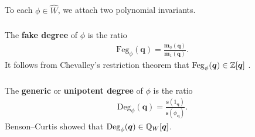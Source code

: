 \documentclass[a4paper,10pt,leqno]{amsart}
\theoremstyle{plain}
\theoremstyle{plain}
\theoremstyle{plain}
\theoremstyle{definition}
\newtheorem{lempost}[thm]{Lemma-Postulate}
\theoremstyle{remark}
\newcommand{\dfemph}[1]{\textbf{#1}}
\newcommand{\Q}{\bm{q}}
\newcommand{\UDeg}{\mathrm{Deg}}
\newcommand{\FDeg}{\mathrm{Feg}}
\begin{document}
\subsection{}\label{subsec:degrees}

To each $\phi \in \hat{W}$, we attach two polynomial invariants.

\subsubsection{}

The \dfemph{fake degree} of $\phi$ is the ratio
\begin{align}
\FDeg_\phi(\Q) = \frac{\bm{m}_\phi(\Q)}{\bm{m}_1(\Q)}.
\end{align}
It follows from Chevalley's restriction theorem that $\FDeg_\phi(\Q) \in \bb{Z}[\Q]$ \cite[\S{2.5-2.6}]{springer_1974}.

\subsubsection{}

The \dfemph{generic} or \dfemph{unipotent degree} of $\phi$ is the ratio
\begin{align}
\UDeg_\phi(\Q) = \frac{\bm{s}(1_{\Q})}{\bm{s}(\phi_{\Q})}.
\end{align}
Benson--Curtis showed \cite[Cor.\ 9.3.6, Rem.\ 9.3.7]{gp} that $\UDeg_\phi(\Q) \in \bb{Q}_W[\Q]$.

\end{document}
